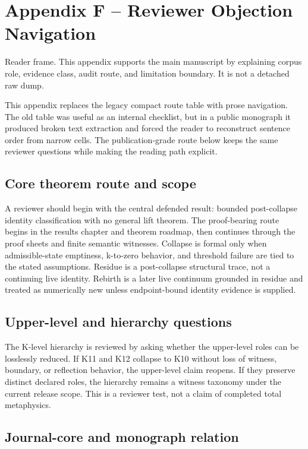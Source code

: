 \section{Appendix F -- Reviewer Objection Navigation}
Reader frame. This appendix supports the main manuscript by explaining corpus role, evidence class, audit route, and limitation boundary. It is not a detached raw dump.


\label{sec:oc13-reviewer-navigation}

This appendix replaces the legacy compact route table with prose navigation. The old table was useful as an internal checklist, but in a public monograph it produced broken text extraction and forced the reader to reconstruct sentence order from narrow cells. The publication-grade route below keeps the same reviewer questions while making the reading path explicit.


\subsection{Core theorem route and scope}

A reviewer should begin with the central defended result: bounded post-collapse identity classification with no general lift theorem. The proof-bearing route begins in the results chapter and theorem roadmap, then continues through the proof sheets and finite semantic witnesses. Collapse is formal only when admissible-state emptiness, k-to-zero behavior, and threshold failure are tied to the stated assumptions. Residue is a post-collapse structural trace, not a continuing live identity. Rebirth is a later live continuum grounded in residue and treated as numerically new unless endpoint-bound identity evidence is supplied.


\subsection{Upper-level and hierarchy questions}

The K-level hierarchy is reviewed by asking whether the upper-level roles can be losslessly reduced. If K11 and K12 collapse to K10 without loss of witness, boundary, or reflection behavior, the upper-level claim reopens. If they preserve distinct declared roles, the hierarchy remains a witness taxonomy under the current release scope. This is a reviewer test, not a claim of completed total metaphysics.


\subsection{Journal-core and monograph relation}

